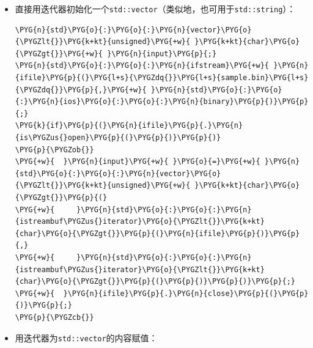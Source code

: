 \begin{itemize}
\item 直接用迭代器初始化一个\texttt{std::\allowbreak{}vector}（类似地，也可用于\texttt{std::\allowbreak{}string}）：



\begin{codeblockbg}
\begin{Verbatim}[commandchars=\\\{\},breaklines=true,breakanywhere=true,fontsize=\codefont,xleftmargin=17bp]
\PYG{n}{std}\PYG{o}{:}\PYG{o}{:}\PYG{n}{vector}\PYG{o}{\PYGZlt{}}\PYG{k+kt}{unsigned}\PYG{+w}{ }\PYG{k+kt}{char}\PYG{o}{\PYGZgt{}}\PYG{+w}{ }\PYG{n}{input}\PYG{p}{;}
\PYG{n}{std}\PYG{o}{:}\PYG{o}{:}\PYG{n}{ifstream}\PYG{+w}{ }\PYG{n}{ifile}\PYG{p}{(}\PYG{l+s}{\PYGZdq{}}\PYG{l+s}{sample.bin}\PYG{l+s}{\PYGZdq{}}\PYG{p}{,}\PYG{+w}{ }\PYG{n}{std}\PYG{o}{:}\PYG{o}{:}\PYG{n}{ios}\PYG{o}{:}\PYG{o}{:}\PYG{n}{binary}\PYG{p}{)}\PYG{p}{;}
\PYG{k}{if}\PYG{p}{(}\PYG{n}{ifile}\PYG{p}{.}\PYG{n}{is\PYGZus{}open}\PYG{p}{(}\PYG{p}{)}\PYG{p}{)}
\PYG{p}{\PYGZob{}}
\PYG{+w}{  }\PYG{n}{input}\PYG{+w}{ }\PYG{o}{=}\PYG{+w}{ }\PYG{n}{std}\PYG{o}{:}\PYG{o}{:}\PYG{n}{vector}\PYG{o}{\PYGZlt{}}\PYG{k+kt}{unsigned}\PYG{+w}{ }\PYG{k+kt}{char}\PYG{o}{\PYGZgt{}}\PYG{p}{(}
\PYG{+w}{     }\PYG{n}{std}\PYG{o}{:}\PYG{o}{:}\PYG{n}{istreambuf\PYGZus{}iterator}\PYG{o}{\PYGZlt{}}\PYG{k+kt}{char}\PYG{o}{\PYGZgt{}}\PYG{p}{(}\PYG{n}{ifile}\PYG{p}{)}\PYG{p}{,}
\PYG{+w}{     }\PYG{n}{std}\PYG{o}{:}\PYG{o}{:}\PYG{n}{istreambuf\PYGZus{}iterator}\PYG{o}{\PYGZlt{}}\PYG{k+kt}{char}\PYG{o}{\PYGZgt{}}\PYG{p}{(}\PYG{p}{)}\PYG{p}{)}\PYG{p}{;}
\PYG{+w}{  }\PYG{n}{ifile}\PYG{p}{.}\PYG{n}{close}\PYG{p}{(}\PYG{p}{)}\PYG{p}{;}
\PYG{p}{\PYGZcb{}}
\end{Verbatim}
\end{codeblockbg}



\item 用迭代器为\texttt{std::\allowbreak{}vector}的内容赋值：




\end{itemize}
